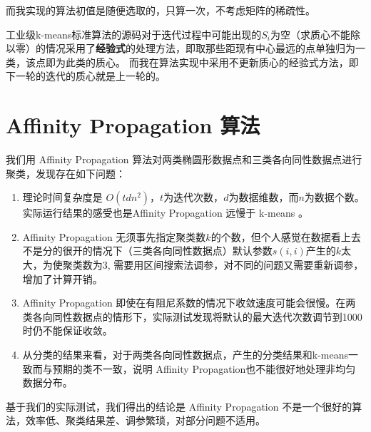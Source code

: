\documentclass{ctexart}
\theoremstyle{definition}
\theoremstyle{remark}
\begin{document}
而我实现的算法初值是随便选取的，只算一次，不考虑矩阵的稀疏性。

工业级k-means标准算法的源码对于迭代过程中可能出现的$S_i$为空（求质心不能除以零）的情况采用了\textbf{经验式}的处理方法，即取那些距现有中心最远的点单独归为一类，该点即为此类的质心。
而我在算法实现中采用不更新质心的经验式方法，即下一轮的迭代的质心就是上一轮的。
\section{Affinity Propagation 算法}
我们用 Affinity Propagation 算法对两类椭圆形数据点和三类各向同性数据点进行聚类，发现存在如下问题：
\begin{enumerate}
\item 理论时间复杂度是 $O(tdn^2)$，$t$为迭代次数，$d$为数据维数，而$n$为数据个数。实际运行结果的感受也是Affinity Propagation 远慢于 k-means 。
\item Affinity Propagation 无须事先指定聚类数$k$的个数，但个人感觉在数据看上去不是分的很开的情况下（三类各向同性数据点）默认参数$s(i,i)$产生的$k$太大，为使聚类数为3, 需要用区间搜索法调参，对不同的问题又需要重新调参，增加了计算开销。
\item Affinity Propagation 即使在有阻尼系数的情况下收敛速度可能会很慢。在两类各向同性数据点的情形下，实际测试发现将默认的最大迭代次数调节到1000时仍不能保证收敛。
\item 从分类的结果来看，对于两类各向同性数据点，产生的分类结果和k-means一致而与预期的类不一致，说明 Affinity Propagation也不能很好地处理非均匀数据分布。
\end{enumerate}
基于我们的实际测试，我们得出的结论是 Affinity Propagation 不是一个很好的算法，效率低、聚类结果差、调参繁琐，对部分问题不适用。
\end{document}
